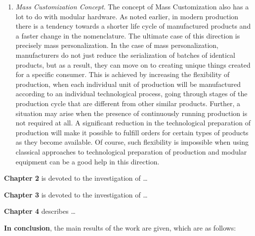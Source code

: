 \begin{enumerate}
	\item\textit{Mass Customization Concept}. The concept of Mass Customization also has a lot to do with modular hardware. As noted earlier, in modern production there is a tendency towards a shorter life cycle of manufactured products and a faster change in the nomenclature. The ultimate case of this direction is precisely mass personalization. In the case of mass personalization, manufacturers do not just reduce the serialization of batches of identical products, but as a result, they can move on to creating unique things created for a specific consumer. This is achieved by increasing the flexibility of production, when each individual unit of production will be manufactured according to an individual technological process, going through stages of the production cycle that are different from other similar products. Further, a situation may arise when the presence of continuously running production is not required at all. A significant reduction in the technological preparation of production will make it possible to fulfill orders for certain types of products as they become available. Of course, such flexibility is impossible when using classical approaches to technological preparation of production and modular equipment can be a good help in this direction.
\end{enumerate}

\textbf{Chapter 2} is devoted to the investigation of \dots

\textbf{Chapter 3} is devoted to the investigation of \dots

\textbf{Chapter 4} describes \dots

\FloatBarrier                      
\textbf{In conclusion}, the main results of the work are given, which are as follows:


